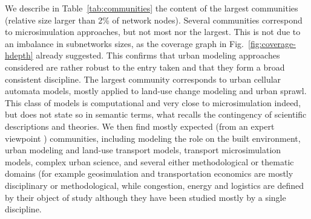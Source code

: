 
We describe in Table~\ref{tab:communities} the content of the largest communities (relative size larger than 2\% of network nodes). Several communities correspond to microsimulation approaches, but not most nor the largest. This is not due to an imbalance in subnetworks sizes, as the coverage graph in Fig.~\ref{fig:coverage-hdepth} already suggested. This confirms that urban modeling approaches considered are rather robust to the entry taken and that they form a broad consistent discipline. The largest community corresponds to urban cellular automata models, mostly applied to land-use change modeling and urban sprawl. This class of models is computational and very close to microsimulation indeed, but does not state so in semantic terms, what recalls the contingency of scientific descriptions and theories. We then find mostly expected (from an expert viewpoint %
) communities, including modeling the role on the built environment, urban modeling and land-use transport models, transport microsimulation models, complex urban science, and several either methodological or thematic domains (for example geosimulation and transportation economics are mostly disciplinary or methodological, while congestion, energy and logistics are defined by their object of study although they have been studied mostly by a single discipline.


